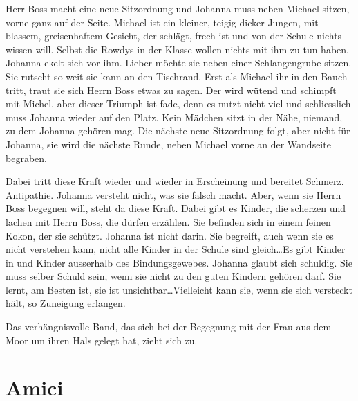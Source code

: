\documentclass[10pt,a5paper]{book}
\begin{document}
Herr Boss macht eine neue Sitzordnung und Johanna muss neben Michael sitzen, vorne ganz auf der Seite. Michael ist ein kleiner, teigig-dicker Jungen, mit blassem, greisenhaftem Gesicht, der schlägt, frech ist und von der Schule nichts wissen will. Selbst die Rowdys in der Klasse wollen nichts mit ihm zu tun haben. Johanna ekelt sich vor ihm. Lieber möchte sie neben einer Schlangengrube sitzen. Sie rutscht so weit sie kann an den Tischrand. Erst als Michael ihr in den Bauch tritt, traut sie sich Herrn Boss etwas zu sagen. Der wird wütend und schimpft mit Michel, aber dieser Triumph ist fade, denn es nutzt nicht viel und schliesslich muss Johanna wieder auf den Platz. Kein Mädchen sitzt in der Nähe, niemand, zu dem Johanna gehören mag. Die nächste neue Sitzordnung folgt, aber nicht für Johanna, sie wird die nächste Runde, neben Michael vorne an der Wandseite begraben.

Dabei tritt diese Kraft wieder und wieder in Erscheinung und bereitet Schmerz. Antipathie. Johanna versteht nicht, was sie falsch macht. Aber, wenn sie Herrn Boss begegnen will, steht da diese Kraft. Dabei gibt es Kinder, die scherzen und lachen mit Herrn Boss, die dürfen erzählen. Sie befinden sich in einem feinen Kokon, der sie schützt. Johanna ist nicht darin. Sie begreift, auch wenn sie es nicht verstehen kann, nicht alle Kinder in der Schule sind gleich\dots Es gibt Kinder in und Kinder ausserhalb des Bindungsgewebes. Johanna glaubt sich schuldig. Sie muss selber Schuld sein, wenn sie nicht zu den guten Kindern gehören darf. Sie lernt, am Besten ist, sie ist unsichtbar\dots Vielleicht kann sie, wenn sie sich versteckt hält, so Zuneigung erlangen.

Das verhängnisvolle Band, das sich bei der Begegnung mit der Frau aus dem Moor um ihren Hals gelegt hat, zieht sich zu.



\section*{Amici}
\end{document}
